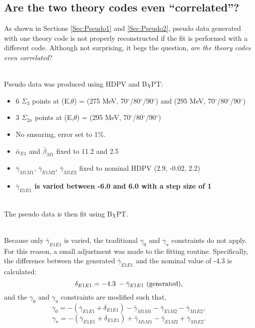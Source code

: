 \documentclass[]{article}
\begin{document}
\newpage
\subsection{Are the two theory codes even \enquote{correlated}?}
As shown in Sections \ref{Sec:Pseudo1} and \ref{Sec:Pseudo2}, pseudo data generated with one theory code is not properly reconstructed if the fit is performed with a different code. Although not surprising, it begs the question, \textit{are the theory codes even correlated}? 

\noindent \\Pseudo data was produced using HDPV and B$\chi$PT:
\begin{itemize}
	\item 6 $\Sigma_{3}$ points at (E,$\theta$) = (275 MeV, 70$^\circ$/80$^\circ$/90$^\circ$) and (295 MeV, 70$^\circ$/80$^\circ$/90$^\circ$)
	\item 3 $\Sigma_{2x}$ points at (E,$\theta$) = (295 MeV, 70$^\circ$/80$^\circ$/90$^\circ$)
	\item No smearing, error set to 1$\%$. 
	\item $\bar{\alpha}_{E1}$ and $\bar{\beta}_{M1}$ fixed to 11.2 and 2.5
	\item $\bar{\gamma}_{M1M1}$, $\bar{\gamma}_{E1M2}$, $\bar{\gamma}_{M1E2}$ fixed to nominal HDPV (2.9, -0.02, 2.2)
	\item \textbf{$\bar{\gamma}_{E1E1}$ is varied between -6.0 and 6.0 with a step size of 1}
\end{itemize}

\noindent \\The pseudo data is then fit using B$\chi$PT. 

\noindent \vspace{5mm}\\Because only $\bar{\gamma}_{E1E1}$ is varied, the traditional $\gamma_{0}$ and $\gamma_{\pi}$ constraints do not apply. For this reason, a small adjustment was made to the fitting routine. Specifically, the difference between the generated $\bar{\gamma}_{E1E1}$ and the nominal value of -4.3 is calculated:
\begin{equation}
\delta_{E1E1} = -4.3 \hspace{1mm} - \bar{\gamma}_{E1E1}\text{ (generated)},
\end{equation}
and the $\gamma_{0}$ and $\gamma_{\pi}$ constraints are modified such that, 
\begin{equation}
\gamma_{0} = -(\bar{\gamma}_{E1E1}+ \delta_{E1E1}) - \bar{\gamma}_{M1M1} - \bar{\gamma}_{E1M2} - \bar{\gamma}_{M1E2}, 
\end{equation}
\begin{equation}
\gamma_{\pi} = -(\bar{\gamma}_{E1E1}+ \delta_{E1E1}) + \bar{\gamma}_{M1M1} - \bar{\gamma}_{E1M2} + \bar{\gamma}_{M1E2}. 
\end{equation}
\end{document}
